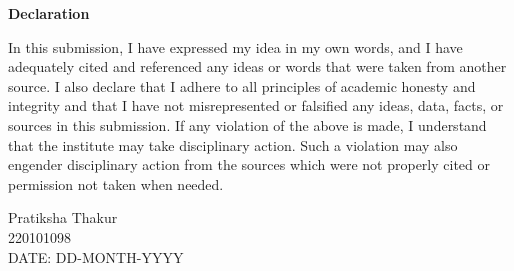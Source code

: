 \documentclass[a4paper, 11pt, oneside]{report}
\begin{document}
\begin{center}
   { \LARGE \textbf{Declaration}}
\end{center}
In this submission, I have expressed my idea in my own words, and I have adequately cited and referenced any ideas or words that were taken from another source. I also declare that I adhere to all principles of academic honesty and integrity and that I have not misrepresented or falsified any ideas, data, facts, or sources in this submission. If any violation of the above is made, I understand that the institute may take disciplinary action. Such a violation may also engender disciplinary action from the sources which were not properly cited or permission not taken when needed.

\vspace{1cm}\hspace{7cm} Pratiksha Thakur \\
\vspace{1cm}\hspace{9cm} 220101098 \\
\vspace{1CM} DATE: DD-MONTH-YYYY

\newpage
\end{document}
